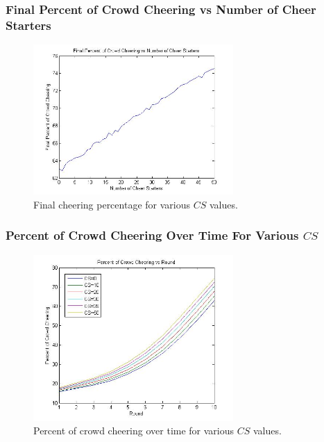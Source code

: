 \documentclass[compress,handout,10pt]{beamer}
\begin{document}
\begin{frame}
	\frametitle{Final Percent of Crowd Cheering vs Number of Cheer Starters}
	\begin{figure} [h]
		\begin{center}
    			\includegraphics [width=3in] {46(1).jpg}
    			\caption {{\tiny Final cheering percentage for various $CS$ values.}}
    		\end{center}
    	\end {figure}	
\end{frame}

\begin{frame}
	\frametitle{Percent of Crowd Cheering Over Time For Various $CS$}
	\begin{figure} [h]
		\begin{center}
    			\includegraphics [width=3in] {46(2).jpg}
    			\caption {{\tiny Percent of crowd cheering over time for various $CS$ values.}}
    		\end{center}
    	\end {figure}	
\end{frame}
\end{document}
